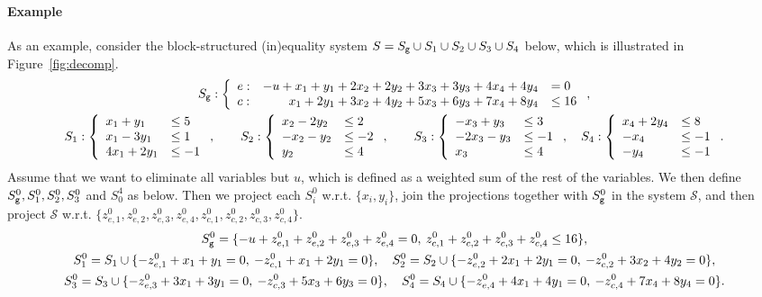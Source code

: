 \paragraph{Example}
As an example, consider the block-structured (in)equality system $S = S_{\texttt{g}} \cup S_1\cup S_2\cup S_3 \cup S_4$ below, which is illustrated in Figure~\ref{fig:decomp}. 
\small{
\begin{gather*}
S_{\texttt{g}}: \left\{ \begin{array}{lrl} e:& -u + x_1 + y_1 + 2 x_2 + 2 y_2 + 3 x_3 + 3 y_3 + 4 x_4 + 4 y_4 &= 0\\
c:& x_1 + 2 y_1 + 3 x_2 + 4 y_2 + 5x_3 + 6 y_3 + 7x_4 + 8 y_4 &\leq 16\end{array}\right.,\\ 
S_1: \left\{ \begin{array}{ll}x_1 + y_1 				&\leq 5\\
															x_1 - 3 y_1 &\leq 1\\
														4 x_1	+ 2 y_1 	&\leq -1\end{array}\right.,\qquad
S_2 : \left\{ \begin{array}{ll}  x_2 - 2 y_2 &\leq 2\\
															 - x_2 - y_2 				&\leq -2\\
																 y_2 							&\leq 4\end{array}\right.,\qquad
S_3 : \left\{ \begin{array}{ll}- x_3 + y_3 			&\leq 3\\
														 - 2 x_3 - y_3 			&\leq -1\\
																 x_3 						&\leq 4\end{array}\right.,\quad
S_4 : \left\{ \begin{array}{ll} x_4 +2 y_4 &\leq 8\\
															- x_4 						&\leq -1\\
															- y_4 						&\leq -1\end{array}\right..
\end{gather*}
}
\normalsize{
Assume that we want to eliminate all variables but $u$, which is defined as a weighted sum of the rest of the variables.
We then define $S_{\texttt{g}}^0, S_1^0, S_2^0, S_3^0$ and $S_0^4$ as below. Then we project each $S_i^0$ w.r.t. $\{x_i, y_i\}$, join the projections together with $S^0_{\texttt{g}}$ in the system $\mathcal{S}$, and then project $\mathcal{S}$ w.r.t. $\{z^0_{e,1}, z^0_{e,2}, z^0_{e,3}, z^0_{e,4}, z^0_{c,1}, z^0_{c,2}, z^0_{c,3}, z^0_{c,4}\}$.}
\small{
\begin{gather*}
S_{\texttt{g}}^0 = \{-u + z_{e,1}^0 + z_{e,2}^0 + z_{e,3}^0 + z_{e,4}^0 = 0, \: 
z_{c,1}^0 + z_{c,2}^0 + z_{c,3}^0 + z_{c,4}^0 \leq 16\},\\
S_1^0 = S_1\cup \{-z_{e,1}^0 + x_1 + y_1 = 0,\: -z_{c,1}^0 + x_1 + 2 y_1 = 0 \},\quad
S_2^0 = S_2\cup \{-z_{e,2}^0 + 2 x_1 + 2 y_1 = 0,\: -z_{c,2}^0 + 3x_2 + 4 y_2 = 0 \},\\
S_3^0 = S_3\cup \{-z_{e,3}^0 + 3 x_1 + 3 y_1 = 0,\: -z_{c,3}^0 + 5 x_3 + 6y_3 = 0 \},\quad
S_4^0 = S_4\cup \{-z_{e,4}^0 + 4 x_1 + 4 y_1 = 0,\: -z_{c,4}^0 + 7 x_4 + 8y_4 = 0 \}.
\end{gather*}
}

